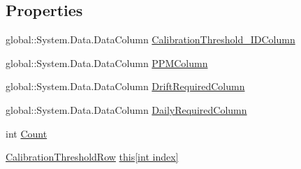 \subsection*{Properties}
\begin{DoxyCompactItemize}
\item 
global\+::\+System.\+Data.\+Data\+Column \hyperlink{class_env_int_1_1_win32_1_1_field_tech_1_1_manager_1_1_data_sets_1_1_guide_ware_mobile_data_set_e4a98fb4b531becb042ae997c9d8a15c_ac46715fc7b19b29fc75e0350f76c3a37}{Calibration\+Threshold\+\_\+\+I\+D\+Column}
\item 
global\+::\+System.\+Data.\+Data\+Column \hyperlink{class_env_int_1_1_win32_1_1_field_tech_1_1_manager_1_1_data_sets_1_1_guide_ware_mobile_data_set_e4a98fb4b531becb042ae997c9d8a15c_a34610abd1b9c764dd6b05b24fb711b58}{P\+P\+M\+Column}
\item 
global\+::\+System.\+Data.\+Data\+Column \hyperlink{class_env_int_1_1_win32_1_1_field_tech_1_1_manager_1_1_data_sets_1_1_guide_ware_mobile_data_set_e4a98fb4b531becb042ae997c9d8a15c_a28a57334b2c7b1b9ebf7138cc171a2e5}{Drift\+Required\+Column}
\item 
global\+::\+System.\+Data.\+Data\+Column \hyperlink{class_env_int_1_1_win32_1_1_field_tech_1_1_manager_1_1_data_sets_1_1_guide_ware_mobile_data_set_e4a98fb4b531becb042ae997c9d8a15c_aa5dee5de6fe6b0626b58c526a5c97e35}{Daily\+Required\+Column}
\item 
int \hyperlink{class_env_int_1_1_win32_1_1_field_tech_1_1_manager_1_1_data_sets_1_1_guide_ware_mobile_data_set_e4a98fb4b531becb042ae997c9d8a15c_a607a1ad24075fcebe69b657739f26732}{Count}
\item 
\hyperlink{class_env_int_1_1_win32_1_1_field_tech_1_1_manager_1_1_data_sets_1_1_guide_ware_mobile_data_set_1_1_calibration_threshold_row}{Calibration\+Threshold\+Row} \hyperlink{class_env_int_1_1_win32_1_1_field_tech_1_1_manager_1_1_data_sets_1_1_guide_ware_mobile_data_set_e4a98fb4b531becb042ae997c9d8a15c_ab8ab0667c8626d0d52f6640e11c44faa}{this\mbox{[}int index\mbox{]}}
\end{DoxyCompactItemize}
